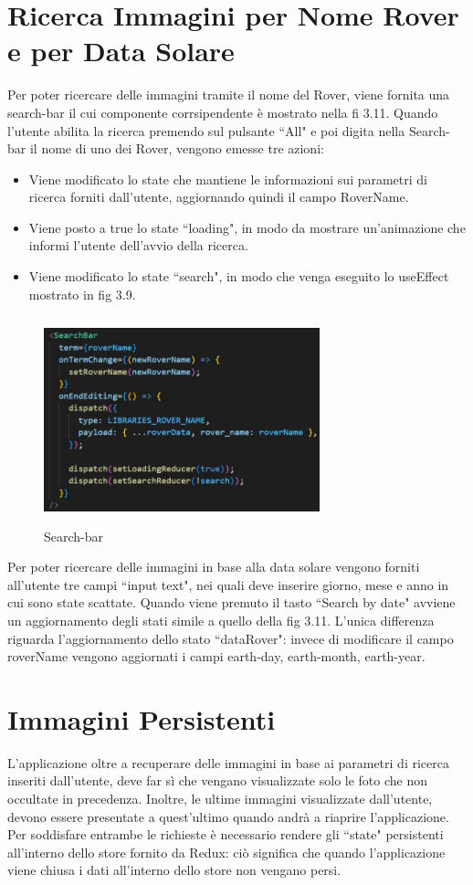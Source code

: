 \section{Ricerca Immagini per Nome Rover e per Data Solare}
Per poter ricercare delle immagini tramite il nome del Rover, viene fornita una search-bar il cui componente corrsipendente \`e mostrato nella fi 3.11. Quando l'utente abilita la ricerca premendo sul pulsante ``All" e poi digita nella Search-bar il nome di uno dei Rover, vengono emesse tre azioni:
\begin{itemize}
    \item Viene modificato lo state che mantiene le informazioni sui parametri di ricerca forniti dall'utente, aggiornando quindi il campo RoverName.
    \item Viene posto a true lo state ``loading", in modo da mostrare un'animazione che informi l'utente dell'avvio della ricerca.
    \item Viene modificato lo state ``search", in modo che venga eseguito lo useEffect mostrato in fig 3.9.
\end{itemize}
\begin{figure}[h]
    \centering
    \includegraphics[width=8cm, height=6cm]{images/SearchBar.jpg}
    \caption[differenzeiteot]{Search-bar}
    \label{fig:Search-bar}
\end{figure}

Per poter ricercare delle immagini in base alla data solare vengono forniti all'utente tre campi ``input text", nei quali deve inserire giorno, mese e anno in cui sono state scattate.
Quando viene premuto il tasto ``Search by date" avviene un aggiornamento degli stati simile a quello della fig 3.11. L'unica differenza riguarda l'aggiornamento dello stato ``dataRover": invece di 
modificare il campo roverName vengono aggiornati i campi earth-day, earth-month, earth-year.

\section{Immagini Persistenti}
L'applicazione oltre a recuperare delle immagini in base ai parametri di ricerca inseriti dall'utente, deve far s\`i che vengano visualizzate solo le foto che non occultate in precedenza. Inoltre, le ultime immagini visualizzate dall'utente, devono essere presentate a quest'ultimo quando andr\`a a riaprire l'applicazione.
Per soddisfare entrambe le richieste \`e necessario rendere gli ``state" persistenti all'interno dello store fornito da Redux: ci\`o significa che quando l'applicazione viene chiusa i dati all'interno dello store non vengano persi.

